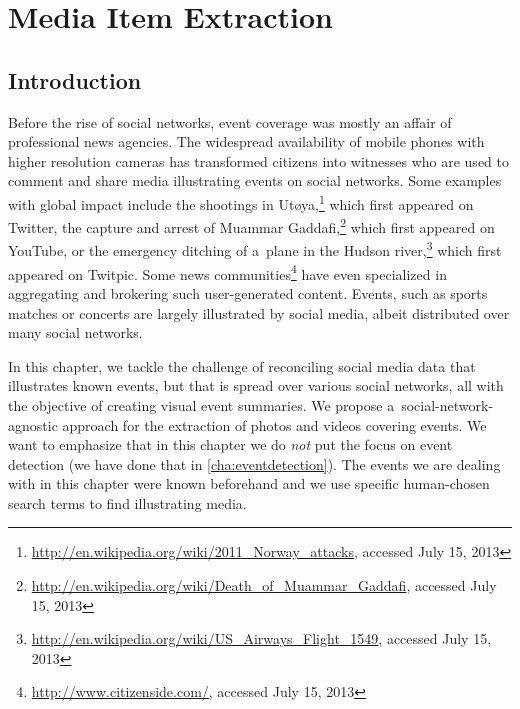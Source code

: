 \chapter{Media Item Extraction}
\label{cha:media-item-extraction}

\ifpdf
    \graphicspath{{5_media_item_extraction/figures/PNG/}{5_media_item_extraction/figures/PDF/}{5_media_item_extraction/figures/}}
\else
    \graphicspath{{5_media_item_extraction/figures/EPS/}{5_media_item_extraction/figures/}}
\fi

\section{Introduction}

Before the rise of social networks,
event coverage was mostly an affair of professional news agencies.
The widespread availability of mobile phones
with higher resolution cameras has transformed
citizens into witnesses who are used to comment
and share media illustrating events on social networks.
Some examples with global impact
include the shootings in
Ut{\o}ya,\footnote{\url{http://en.wikipedia.org/wiki/2011_Norway_attacks},
accessed July 15, 2013}
which first appeared on Twitter,
the capture and arrest of Muammar
Gaddafi,\footnote{\url{http://en.wikipedia.org/wiki/Death_of_Muammar_Gaddafi},
accessed July 15, 2013}
which first appeared on YouTube,
or the emergency ditching of a~plane in the Hudson
river,\footnote{\url{http://en.wikipedia.org/wiki/US_Airways_Flight_1549},
accessed July 15, 2013}
which first appeared on Twitpic.
Some news
communities\footnote{\url{http://www.citizenside.com/},
accessed July 15, 2013}
have even specialized in aggregating and brokering
such user-generated content.
Events, such as sports matches or concerts are
largely illustrated by social media,
albeit distributed over many social networks.

In this chapter, we tackle the challenge of reconciling
social media data that illustrates known events,
but that is spread over various social networks,
all with the objective of creating visual event summaries.
We propose a~social-network-agnostic
approach for the extraction of photos and videos covering events.
We want to emphasize that in this chapter we do \emph{not}
put the focus on event detection (we have done that in \autoref{cha:eventdetection}).
The events we are dealing with in this chapter
were known beforehand and we use specific
human-chosen search terms to find illustrating media.

